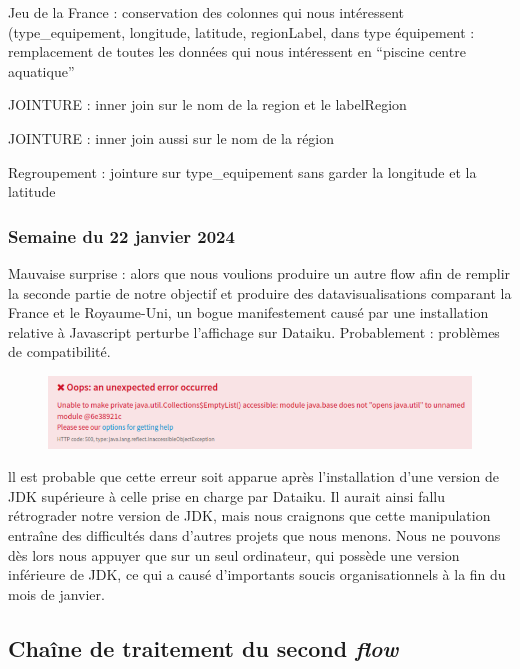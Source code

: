 \documentclass[hidelinks, 12pt]{article}
\begin{document}
Jeu de la France : conservation des colonnes qui nous intéressent (type_equipement, longitude, latitude, regionLabel, dans type équipement : remplacement de toutes les données qui nous intéressent en \enquote{piscine centre aquatique}

JOINTURE : inner join sur le nom de la region et le labelRegion 

JOINTURE : inner join aussi sur le nom de la région


Regroupement : jointure sur type_equipement sans garder la longitude et la latitude 











\subsubsection{Semaine du 22 janvier 2024}

Mauvaise surprise : alors que nous voulions produire un autre flow afin de remplir la seconde partie de notre objectif et produire des datavisualisations comparant la France et le Royaume-Uni, un bogue manifestement causé par une installation relative à Javascript perturbe l'affichage sur Dataiku. Probablement : problèmes de compatibilité.

\begin{center}
	\begin{figure}[H]
		\includegraphics[scale=0.5]{bogue.png}
	\end{figure}
\end{center}

ll est probable que cette erreur soit apparue après l’installation d’une version de JDK supérieure à celle prise en charge par Dataiku. Il aurait ainsi fallu rétrograder notre version de JDK, mais nous craignons que cette manipulation entraîne des difficultés dans d’autres projets que nous menons. Nous ne pouvons dès lors nous appuyer que sur un seul ordinateur, qui possède une version inférieure de JDK, ce qui a causé d’importants soucis organisationnels à la fin du mois de janvier.

\subsection{Chaîne de traitement du second \emph{flow}}
\end{document}
